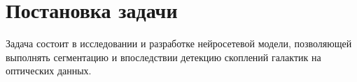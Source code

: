 \chapter{Постановка задачи}
\label{cha:ch_1}

Задача состоит в исследовании и разработке нейросетевой модели, позволяющей выполнять сегментацию 
и впоследствии детекцию скоплений галактик на оптических данных.\\

